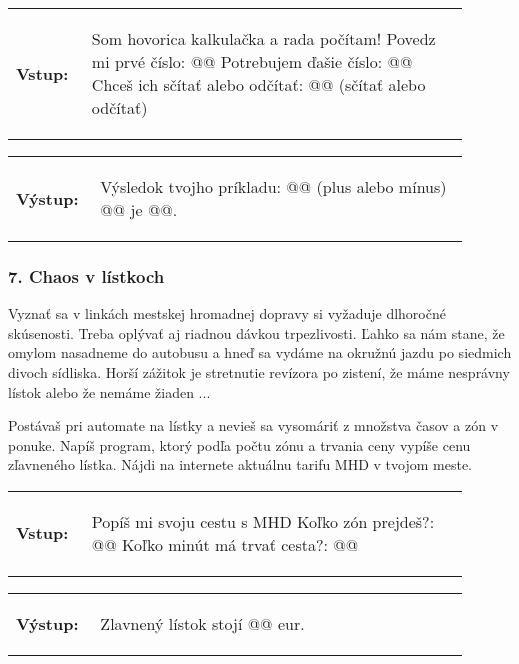 \begin{tabular}{@{}p{0.15\linewidth}p{0.75\linewidth}}
\textbf{\small Vstup:} &
\vspace{-3em}
\begin{code}
Som hovorica kalkulačka a rada počítam!
Povedz mi prvé číslo: @\fbox{\phantom{vstup}}@
Potrebujem ďašie číslo: @\fbox{\phantom{vstup}}@
Chceš ich sčítať alebo odčítať: @\fbox{\phantom{vstup}}@ (sčítať alebo odčítať)
\end{code}
\end{tabular}

\vspace{-2em}
\begin{tabular}{@{}p{0.15\linewidth}p{0.75\linewidth}}
\textbf{\small Výstup:} &
\vspace{-3em}
\begin{code}
Výsledok tvojho príkladu: @\fbox{\phantom{vstup}}@ (plus alebo mínus) @\fbox{\phantom{vstup}}@ je @\fbox{\phantom{vstup}}@.
\end{code}
\end{tabular}
\vspace{-2em}

\subsubsection*{7. Chaos v lístkoch}
Vyznať sa v linkách mestskej hromadnej dopravy si vyžaduje dlhoročné skúsenosti. Treba oplývať aj riadnou dávkou trpezlivosti. Ľahko sa nám stane, že omylom nasadneme do autobusu a hneď sa vydáme na okružnú jazdu po siedmich divoch sídliska. Horší zážitok je stretnutie revízora po zistení, že máme nesprávny lístok alebo že nemáme žiaden ...

Postávaš pri automate na lístky a nevieš sa vysomáriť z množstva časov a zón v ponuke. Napíš program, ktorý podľa počtu zónu a trvania ceny vypíše cenu zľavneného lístka. Nájdi na internete aktuálnu tarifu MHD v tvojom meste.

\begin{tabular}{@{}p{0.15\linewidth}p{0.75\linewidth}}
\textbf{\small Vstup:} &
\vspace{-3em}
\begin{code}
Popíš mi svoju cestu s MHD
Koľko zón prejdeš?: @\fbox{\phantom{vstup}}@
Koľko minút má trvať cesta?: @\fbox{\phantom{vstup}}@
\end{code}
\end{tabular}

\vspace{-2em}
\begin{tabular}{@{}p{0.15\linewidth}p{0.75\linewidth}}
\textbf{\small Výstup:} &
\vspace{-3em}
\begin{code}
Zlavnený lístok stojí @\fbox{\phantom{vstup}}@ eur.
\end{code}
\end{tabular}
\vspace{-2em}


